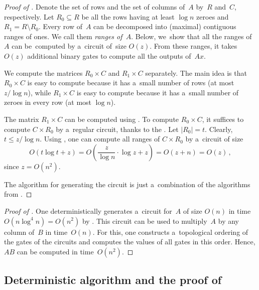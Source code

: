 \documentclass{toc}
\begin{document}
\begin{proof}[Proof of {}]
Denote the set of rows and the set of columns of~$A$ by~$R$
and~$C$, respectively. Let $R_0 \subseteq R$ be all the rows
having at least $\log n$ zeroes and $R_1=R \setminus R_0$.
Every row of~$A$ can be decomposed into (maximal) contiguous ranges of ones. We
call them \emph{ranges of~$A$}.
Below, we~show that all the ranges of~$A$
can be~computed by a~circuit of~size $O(z)$.
From these
ranges, it takes $O(z)$ additional binary gates to compute all the outputs of~$Ax$.

We compute the matrices $R_0 \times C$ and $R_1 \times C$
separately. The main idea is that $R_0 \times C$ is easy to compute
because it has a~small number of rows (at most $z/\log n$), while $R_1 \times C$
is easy to compute because it has a~small number of zeroes in every row (at most
$\log n$).

The matrix $R_1 \times C$ can be computed using . To
compute $R_0 \times C$, it suffices to compute $C \times R_0$ by a~regular
circuit, thanks to the .
Let $|R_0|=t$. Clearly, $t \le z/\log n$.
Using , one can compute all
ranges of $C \times R_0$ by a~circuit of size
\[O(t\log t+z)=O\left(\frac{z}{\log n} \cdot \log z+z\right)=O(z+n)=O(z)\, ,\]
since $z =O(n^2)$.

The algorithm for generating the circuit is just a~combination
of the algorithms from  .
\end{proof}

\begin{proof}[Proof of {}]
	One deterministically generates a~circuit for~$A$ of size $O(n)$ in time
	$O(n\log^4n)=O(n^2)$ by .
	This circuit can be used to multiply~$A$ by any column of~$B$
	in time~$O(n)$. For this, one constructs a~topological ordering of the gates of
	the circuits and computes the values of all gates in this order. Hence, $AB$ can
	be computed in time~$O(n^2)$.
\end{proof}


\subsection{Deterministic algorithm and the proof of }\label{sec:deterministic}
\end{document}
